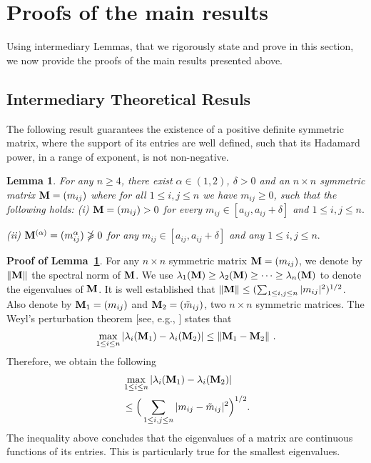\documentclass[conference,letterpaper]{IEEEtran}
\numberwithin{equation}{section}
\newcommand{\lbl}{\label}
\newcommand{\bd}{\bold}
\newcommand{\bea}{\begin{eqnarray}}
\newcommand{\eea}{\end{eqnarray}}
\newtheorem{lemma}{{\sc Lemma}}[section]
\begin{document}
\section{Proofs of the main results}\lbl{sec:proofs}
Using intermediary Lemmas, that we rigorously state and prove in this section, we now provide the proofs of the main results presented above.

\subsection{Intermediary Theoretical Resuls}
The following result guarantees the existence of a positive definite symmetric matrix, where the support of its entries are well defined, such that its Hadamard power, in a range of exponent, is not non-negative.
\begin{lemma}\lbl{lemma:lem1} For any $n\geq 4$, there exist $\alpha\in (1,2)$, $\delta>0$ and an $n\times n$ symmetric matrix $\bd{M}=(m_{ij})$ where for all $1\leq i, j \leq n$ we have $m_{ij}\geq 0$, such that the following holds:
(i) $\bd{M}=(m_{ij})>0$  for every $m_{ij}\in [a_{ij}, a_{ij}+\delta]$ and $1\leq i, j \leq n.$

(ii) $\bd{M}^{(\alpha)}=(m_{ij}^{\alpha})\ngeqslant 0$  for any $m_{ij}\in [a_{ij}, a_{ij}+\delta]$ and any $1\leq i, j \leq n.$
\end{lemma}
\medskip
\noindent\textbf{Proof of Lemma~\ref{lemma:lem1}}. For any $n\times n$ symmetric matrix $\bd{M}=(m_{ij})$, we denote by $\|\bd{M}\|$ the spectral norm of $\bd{M}$. 
We use $\lambda_1(\bd{M})\geq \lambda_2(\bd{M})\geq \cdots \geq \lambda_n(\bd{M})$ to denote  the eigenvalues of $\bd{M}$.  
It is well established that $\|\bd{M}\|\leq (\sum_{1\leq i, j \leq n}|m_{ij}|^2)^{1/2}$. 
Also denote by $\bd{M}_1=(m_{ij})$ and $\bd{M}_2=(\tilde{m}_{ij})$, two $n\times n$ symmetric matrices. 
The Weyl's perturbation theorem [see, e.g., \cite{horn1985}] states that
$$\max_{1\leq i \leq n}|\lambda_i(\bd{M}_1)-\lambda_i(\bd{M}_2)|\leq \|\bd{M}_1-\bd{M}_2\| \ .$$  
Therefore, we obtain the following
\bea
& \max_{1\leq i \leq n}|\lambda_i(\bd{M}_1)-\lambda_i(\bd{M}_2)|\\\notag
&\leq \Big(\sum_{1\leq i, j \leq n}|m_{ij}-\tilde{m}_{ij}|^2\Big)^{1/2}.\lbl{flower_could}
\eea
The inequality above concludes that the eigenvalues of a matrix are continuous functions of its entries. 
This is particularly true for the smallest eigenvalues.
\end{document}
